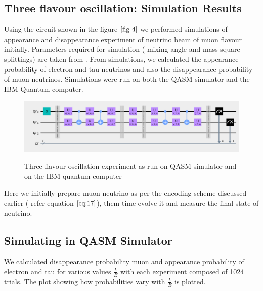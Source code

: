 \documentclass[12pt,a4paper]{report}
\begin{document}
\subsection{Three flavour oscillation: Simulation Results}
Using the circuit shown in the figure $\ref*{fig 4}$ we performed simulations of appearance and disappearance experiment of neutrino beam of muon flavour initially. Parameters required for simulation ( mixing angle and mass square splittings) are taken from \cite{estaban}. From simulations, we calculated the appearance probability of electron and tau neutrinos and also the disappearance probability of muon neutrinos. Simulations were run on both the QASM simulator and the IBM Quantum computer.
\begin{figure}[H]
\graphicspath{ {./Images/} }
\centering	
{\includegraphics[width=\textwidth]{fig_7.png}}
\caption{Three-flavour oscillation experiment as run on QASM simulator and on the IBM quantum computer}
\label{fig 7}
\end{figure}\par
Here we initially prepare muon neutrino as per the encoding scheme discussed earlier ( refer equation $\ref{eq:17}$), them time evolve it and measure the final state of neutrino.
\subsection{Simulating in QASM Simulator}
We calculated disappearance probability muon and appearance probability of electron and tau for various values $\frac{L}{E}$ with each experiment composed of 1024 trials. The plot showing how probabilities vary with $\frac{L}{E}$ is plotted.
\end{document}
